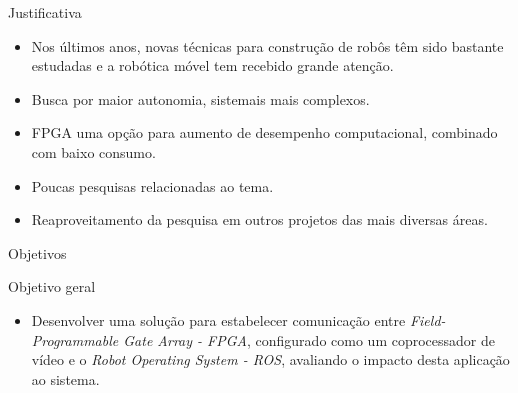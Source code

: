 \documentclass[10pt]{beamer}
\begin{document}
\begin{frame}[fragile]{Justificativa}
    \begin{itemize}
        \item Nos últimos anos, novas técnicas para construção de robôs têm sido bastante estudadas e a robótica móvel tem recebido grande atenção.
        \item Busca por maior autonomia, sistemais mais complexos.
        \item FPGA uma opção para aumento de desempenho computacional, combinado com baixo consumo.
        \item Poucas pesquisas relacionadas ao tema.
        \item Reaproveitamento da pesquisa em outros projetos das mais diversas áreas.
    \end{itemize}
\end{frame}




{
\begin{frame}{Objetivos}
    \begin{alertblock}{Objetivo geral}
    	\begin{itemize}
    	\item Desenvolver uma solução para estabelecer comunicação entre \textit{Field-Programmable Gate Array - FPGA}, configurado como um coprocessador de vídeo e o \textit{Robot Operating System - ROS}, avaliando o impacto desta aplicação ao sistema.
    	\end{itemize}
    \end{alertblock}
\end{frame}
}
\end{document}
